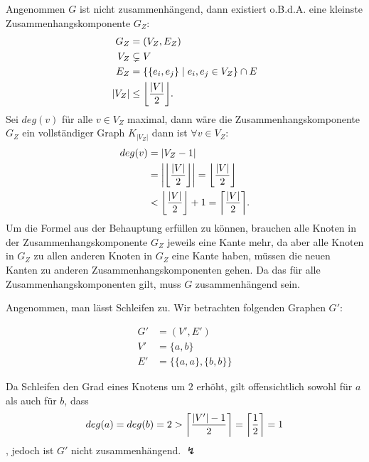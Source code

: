 \documentclass[ngerman,landscape,twocolumn]{adtexsheet}
\DeclarePairedDelimiter\ceil{\lceil}{\rceil}
\DeclarePairedDelimiter\floor{\lfloor}{\rfloor}
\DeclarePairedDelimiter\abs{|}{|}
\begin{document}
\begin{question}
\begin{enumerate}
            Angenommen $G$ ist nicht zusammenhängend, dann existiert o.B.d.A. eine kleinste Zusammenhangskomponente $G_Z$:
            \begin{align*}
                G_Z &=(V_Z, E_Z) \\
                V_Z &\subsetneq V \\
                E_Z &= \{\{e_i, e_j\}\; |\; e_i, e_j \in V_Z\} \cap E \\
                |V_Z| &\leq \floor*{\frac{|V|}{2}}
            .\end{align*}
            Sei $deg(v)$ für alle $v \in V_Z$ maximal, dann wäre die Zusammenhangskomponente $G_Z$ ein vollständiger Graph $K_{|V_Z|}$ dann ist $\forall v \in V_Z$:
            \begin{align*}
                deg(v) &= |V_Z-1| \\
                 &= \abs*{\floor*{\frac{|V|}{2}}} = \floor*{\frac{|V|}{2}}\\
                 &< \floor*{\frac{|V|}{2}} + 1  = \ceil*{\frac{|V|}{2}}
            .\end{align*}
            Um die Formel aus der Behauptung erfüllen zu können, brauchen alle Knoten in der Zusammenhangskomponente $G_Z$ jeweils eine Kante mehr, da aber alle Knoten in $G_Z$ zu allen anderen Knoten in $G_Z$ eine Kante haben, müssen die neuen Kanten zu anderen Zusammenhangskomponenten gehen. Da das für alle Zusammenhangskomponenten gilt, muss $G$ zusammenhängend sein. \hfill \qedsymbol

\newpage
            Angenommen, man lässt Schleifen zu. Wir betrachten folgenden Graphen $G'$:
            
        \begin{figure}[ht]
            \centering
            \begin{align*}
                G' &=(V', E') \\
                V' &= \{a,b\} \\
                E' &= \{ \{a,a\}, \{b,b\} \}
            \end{align*}
            \endminipage
            \centering
            \endminipage
        \end{figure}
            Da Schleifen den Grad eines Knotens um $2$ erhöht, gilt offensichtlich sowohl für $a$ als auch für $b$, dass
\[
    deg(a)=deg(b)=2 > \ceil*{\frac{|V'|-1}{2}} = \ceil*{\frac{1}{2}} = 1
\]
            , jedoch ist  $G'$ nicht zusammenhängend. $\lightning$
    \end{enumerate}
\end{question}
\end{document}
